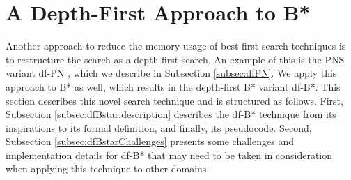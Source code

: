 


    

\newpage

\section{A Depth-First Approach to B*}
\label{sec:dfBstar}
Another approach to reduce the memory usage of best-first search techniques is to restructure the search as a depth-first search. An example of this is the PNS variant df-PN \cite{Nagai2002}, which we describe in Subsection \ref{subsec:dfPN}. We apply this approach to B* as well, which results in the depth-first B* variant df-B*. This section describes this novel search technique and is structured as follows. First, Subsection \ref{subsec:dfBstar:description} describes the df-B* technique from its inspirations to its formal definition, and finally, its pseudocode. Second, Subsection \ref{subsec:dfBstarChallenges} presents some challenges and implementation details for df-B* that may need to be taken in consideration when applying this technique to other domains.

